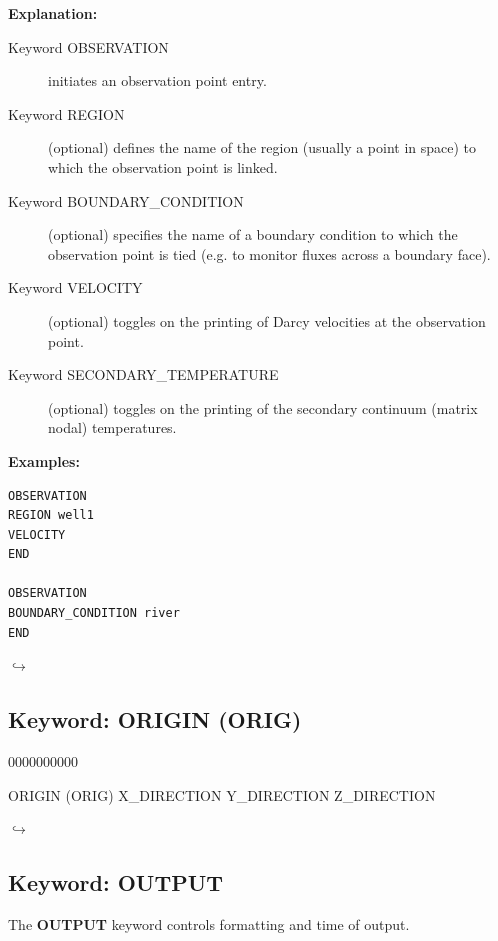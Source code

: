 \documentclass[12pt]{article}
\newcommand\return{{\hfill$\hookrightarrow$}}
\begin{document}
{\noindent\bf Explanation:}
\begin{description}
\item[Keyword OBSERVATION] initiates an observation point entry.
\item[Keyword REGION] (optional) defines the name of the region (usually a point in space) to which the observation point is linked.
\item[Keyword BOUNDARY\_CONDITION] (optional) specifies the name of a boundary condition to which the observation point is tied (e.g. to monitor fluxes across a boundary face).
\item[Keyword VELOCITY] (optional) toggles on the printing of Darcy velocities at the observation point.
\item[Keyword SECONDARY\_TEMPERATURE] (optional) toggles on the printing of the secondary continuum (matrix nodal) temperatures.
\end{description}

{\noindent\bf Examples:}
\begin{verbatim}
OBSERVATION
REGION well1
VELOCITY
END

OBSERVATION
BOUNDARY_CONDITION river
END
\end{verbatim}

\hyperlink{target_key}{\return}


\newpage
\protect\hypertarget{target_orig}{}

\subsection{Keyword: ORIGIN (ORIG)}
\begin{deflist}{0000000000}
\item[ORIGIN (ORIG)] X\_DIRECTION Y\_DIRECTION Z\_DIRECTION
\end{deflist}

\hyperlink{target_key}{\return}



\newpage
\protect\hypertarget{target_output}{}

\subsection{Keyword: OUTPUT}

 The {\bf OUTPUT} keyword controls formatting and time of output.
\end{document}
